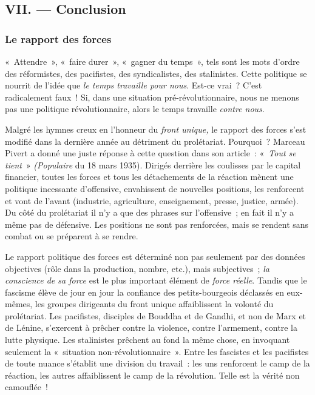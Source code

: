 \documentclass[french,twoside]{book} %
\begin{document}
\subsection[{VII. — Conclusion}]{VII. — Conclusion}
\subsubsection[{Le rapport des forces}]{Le rapport des forces}
\noindent « Attendre », « faire durer », « gagner du temps », tels sont les mots d’ordre des réformistes, des pacifistes, des syndicalistes, des stalinistes. Cette politique se nourrit de l’idée que \emph{le temps travaille pour nous}. Est-ce vrai ? C’est radicalement faux ! Si, dans une situation pré-révolutionnaire, nous ne menons pas une politique révolutionnaire, alors le temps travaille \emph{contre nous}.\par
Malgré les hymnes creux en l’honneur du \emph{front unique, }le rapport des forces s’est modifié dans la dernière année au détriment du prolétariat. Pourquoi ? Marceau Pivert a donné une juste réponse à cette question dans son article : « \emph{Tout se tient} » \emph{(Populaire} du 18 mars 1935). Dirigés derrière les coulisses par le capital financier, toutes les forces et tous les détachements de la réaction mènent une politique incessante d’offensive, envahissent de nouvelles positions, les renforcent et vont de l’avant (industrie, agriculture, enseignement, presse, justice, armée). Du côté du prolétariat il n’y a que des phrases sur l’offensive ; en fait il n’y a même pas de défensive. Les positions ne sont pas renforcées, mais se rendent sans combat ou se préparent à se rendre.\par
Le rapport politique des forces est déterminé non pas seulement par des données objectives (rôle dans la production, nombre, etc.), mais subjectives ; \emph{la conscience de sa  force} est le plus important élément de \emph{force réelle}. Tandis que le fascisme élève de jour en jour la confiance des petits-bourgeois déclassés en eux-mêmes, les groupes dirigeants du front unique affaiblissent la volonté du prolétariat. Les pacifistes, disciples de Bouddha et de Gandhi, et non de Marx et de Lénine, s’exercent à prêcher contre la violence, contre l’armement, contre la lutte physique. Les stalinistes prêchent au fond la même chose, en invoquant seulement la « situation non-révolutionnaire ». Entre les fascistes et les pacifistes de toute nuance s’établit une division du travail : les uns renforcent le camp de la réaction, les autres affaiblissent le camp de la révolution. Telle est la vérité non camouflée !
\end{document}
